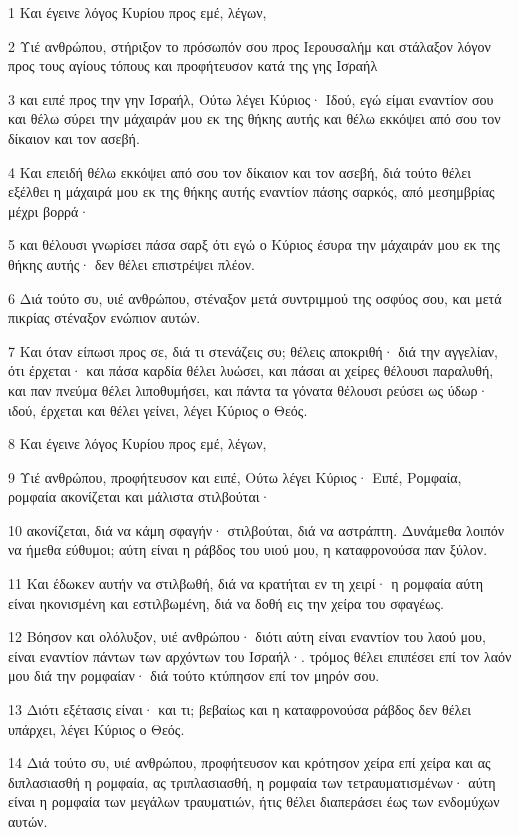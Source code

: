 \par 1 Και έγεινε λόγος Κυρίου προς εμέ, λέγων,
\par 2 Υιέ ανθρώπου, στήριξον το πρόσωπόν σου προς Ιερουσαλήμ και στάλαξον λόγον προς τους αγίους τόπους και προφήτευσον κατά της γης Ισραήλ
\par 3 και ειπέ προς την γην Ισραήλ, Ούτω λέγει Κύριος· Ιδού, εγώ είμαι εναντίον σου και θέλω σύρει την μάχαιράν μου εκ της θήκης αυτής και θέλω εκκόψει από σου τον δίκαιον και τον ασεβή.
\par 4 Και επειδή θέλω εκκόψει από σου τον δίκαιον και τον ασεβή, διά τούτο θέλει εξέλθει η μάχαιρά μου εκ της θήκης αυτής εναντίον πάσης σαρκός, από μεσημβρίας μέχρι βορρά·
\par 5 και θέλουσι γνωρίσει πάσα σαρξ ότι εγώ ο Κύριος έσυρα την μάχαιράν μου εκ της θήκης αυτής· δεν θέλει επιστρέψει πλέον.
\par 6 Διά τούτο συ, υιέ ανθρώπου, στέναξον μετά συντριμμού της οσφύος σου, και μετά πικρίας στέναξον ενώπιον αυτών.
\par 7 Και όταν είπωσι προς σε, διά τι στενάζεις συ; θέλεις αποκριθή· διά την αγγελίαν, ότι έρχεται· και πάσα καρδία θέλει λυώσει, και πάσαι αι χείρες θέλουσι παραλυθή, και παν πνεύμα θέλει λιποθυμήσει, και πάντα τα γόνατα θέλουσι ρεύσει ως ύδωρ· ιδού, έρχεται και θέλει γείνει, λέγει Κύριος ο Θεός.
\par 8 Και έγεινε λόγος Κυρίου προς εμέ, λέγων,
\par 9 Υιέ ανθρώπου, προφήτευσον και ειπέ, Ούτω λέγει Κύριος· Ειπέ, Ρομφαία, ρομφαία ακονίζεται και μάλιστα στιλβούται·
\par 10 ακονίζεται, διά να κάμη σφαγήν· στιλβούται, διά να αστράπτη. Δυνάμεθα λοιπόν να ήμεθα εύθυμοι; αύτη είναι η ράβδος του υιού μου, η καταφρονούσα παν ξύλον.
\par 11 Και έδωκεν αυτήν να στιλβωθή, διά να κρατήται εν τη χειρί· η ρομφαία αύτη είναι ηκονισμένη και εστιλβωμένη, διά να δοθή εις την χείρα του σφαγέως.
\par 12 Βόησον και ολόλυξον, υιέ ανθρώπου· διότι αύτη είναι εναντίον του λαού μου, είναι εναντίον πάντων των αρχόντων του Ισραήλ·. τρόμος θέλει επιπέσει επί τον λαόν μου διά την ρομφαίαν· διά τούτο κτύπησον επί τον μηρόν σου.
\par 13 Διότι εξέτασις είναι· και τι; βεβαίως και η καταφρονούσα ράβδος δεν θέλει υπάρχει, λέγει Κύριος ο Θεός.
\par 14 Διά τούτο συ, υιέ ανθρώπου, προφήτευσον και κρότησον χείρα επί χείρα και ας διπλασιασθή η ρομφαία, ας τριπλασιασθή, η ρομφαία των τετραυματισμένων· αύτη είναι η ρομφαία των μεγάλων τραυματιών, ήτις θέλει διαπεράσει έως των ενδομύχων αυτών.
